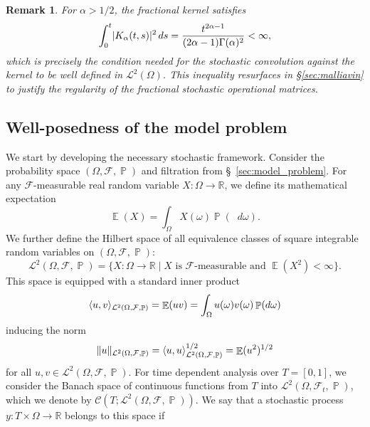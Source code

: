 \documentclass[11pt, a4paper]{article}
\theoremstyle{theoremstyle}
\theoremstyle{definitionstyle}
\newtheorem{remark}[theorem]{Remark}
\newcommand{\dd}{\mathop{}\!d}
\DeclareMathOperator{\PP}{\mathbb P}
\DeclareMathOperator{\EE}{\mathbb E}
\DeclarePairedDelimiter{\norm}{\lVert}{\rVert}
\DeclarePairedDelimiter{\abs}{\lvert}{\rvert}
\DeclarePairedDelimiter{\ip}{\langle}{\rangle}
\begin{document}
\begin{remark}\label{rem:kernel_l2}
    For $\alpha > 1/2$, the fractional kernel satisfies
    \begin{equation}
        \int_0^t \abs{K_\alpha(t, s)}^2 \dd{s} = \frac{t^{2\alpha-1}}{(2\alpha-1)\Gamma(\alpha)^2} < \infty,
    \end{equation}
    which is precisely the condition needed for the stochastic convolution against the kernel to be well defined in $\mathcal L^2(\Omega)$. This inequality resurfaces in \S\ref{sec:malliavin} to justify the regularity of the fractional stochastic operational matrices.
\end{remark}

\subsection{Well-posedness of the model problem}\label{sec:well_posedness}
We start by developing the necessary stochastic framework. Consider the probability space $(\Omega, \mathcal F, \PP)$ and filtration from \S~\ref{sec:model_problem}. For any $\mathcal F$-measurable real random variable $X : \Omega \to \mathbb R$, we define its mathematical expectation
\begin{equation}
    \EE (X) = \int_{\Omega}X(\omega)\PP(\dd{\omega}).
\end{equation}
We further define the Hilbert space of all equivalence classes of square integrable random variables on $(\Omega, \mathcal F, \PP)$:
\begin{equation}
    \mathcal L^2(\Omega, \mathcal F, \PP) = \{X : \Omega \to \mathbb R \mid \text{$X$ is $\mathcal F$-measurable and $\EE(X^2) < \infty$}\}.
\end{equation}
This space is equipped with a standard inner product
\begin{equation}
    \ip{u, v}_{\mathcal L^2(\Omega, \mathcal F, \PP)} = \EE(uv) = \int_{\Omega}u(\omega)v(\omega)\PP(\dd{\omega})
\end{equation}
inducing the norm
\begin{equation}
    \norm{u}_{\mathcal L^2(\Omega, \mathcal F, \PP)} = \ip{u, u}_{\mathcal L^2(\Omega, \mathcal F, \PP)}^{1/2} = \EE (u^2)^{1/2}
\end{equation}
for all $u, v \in \mathcal L^2(\Omega, \mathcal F, \PP)$. For time dependent analysis over $T = [0, 1]$, we consider the Banach space of continuous functions from $T$ into $\mathcal L^2(\Omega, \mathcal F_t, \PP)$, which we denote by $\mathcal C(T; \mathcal L^2(\Omega, \mathcal F, \PP))$. We say that a stochastic process $y : T \times \Omega \to \mathbb R$ belongs to this space if
\end{document}
